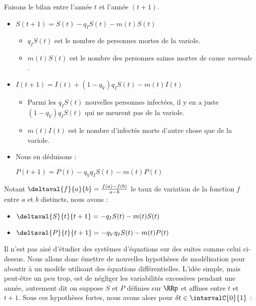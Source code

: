 

\medskip


Faisons le bilan entre l'année $t$ et l'année $(t + 1)$.

\begin{itemize}[label=\small\textbullet]
	\item $S(t + 1) = S(t) - q_I S(t) - m(t) S(t)$
	\begin{itemize}[label=$\rightarrow$]	
		\item $q_I S(t)$ est le nombre de personnes mortes de la variole.
		
		\item $m(t) S(t)$ est le nombre des personnes saines mortes de cause \emph{\og normale \fg}.
	\end{itemize}


	\item $I(t + 1) = I(t) + (1 - q_V) q_I S(t) - m(t) I(t)$
	\begin{itemize}[label=$\rightarrow$]	
		\item Parmi les $q_I S(t)$ nouvelles personnes infectées, il y en a juste $(1 - q_V) q_I S(t)$ qui ne meurent pas de la variole.
		
		\item $m(t) I(t)$ est le nombre d'infectés morts d'autre chose que de la variole.
	\end{itemize}


	\item Nous en déduisons :
	
	\noindent
	$P(t + 1) = P(t) - q_V q_I S(t) - m(t) P(t)$
\end{itemize}


Notant $\deltaval{f}{a}{b} = \frac{f(a) - f(b)}{a - b}$ le taux de variation de la fonction $f$ entre $a$ et $b$ distincts, nous avons :

\begin{itemize}[label=\small\textbullet]
	\item $\deltaval{S}{t}{t+1} = - q_I S(t) - m(t) S(t)$

	\item $\deltaval{P}{t}{t+1} = - q_V q_I S(t) - m(t) P(t)$
\end{itemize}




\medskip


Il n'est pas aisé d'étudier des systèmes d'équations sur des suites comme celui ci-dessus. Nous allons donc émettre de nouvelles hypothèses de modélisation pour aboutir à un modèle utilisant des équations différentielles.
L'idée simple, mais peut-être un peu trop, est de négliger les variabilités excessives pendant une année, autrement dit on suppose $S$ et $P$ définies sur $\RRp$ et affines entre $t$ et $t+1$.
Sous ces hypothèses fortes, nous avons alors pour $\delta t \in \intervalC{0}{1}$ :

